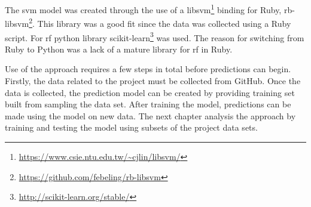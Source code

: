 The \gls{svm} model was created through the use of a libsvm\footnote{\url{https://www.csie.ntu.edu.tw/~cjlin/libsvm/}} binding for Ruby, rb-libsvm\footnote{\url{https://github.com/febeling/rb-libsvm}}. This library was a good fit since the data was collected using a Ruby script. For \gls{rf} python library scikit-learn\footnote{\url{http://scikit-learn.org/stable/}} was used. The reason for switching from Ruby to Python was a lack of a mature library for \gls{rf} in Ruby.

Use of the approach requires a few steps in total before predictions can begin. Firstly, the data related to the project must be collected from GitHub. Once the data is collected, the prediction model can be created by providing training set built from sampling the data set. After training the model, predictions can be made using the model on new data. The next chapter analysis the approach by training and testing the model using subsets of the project data sets.